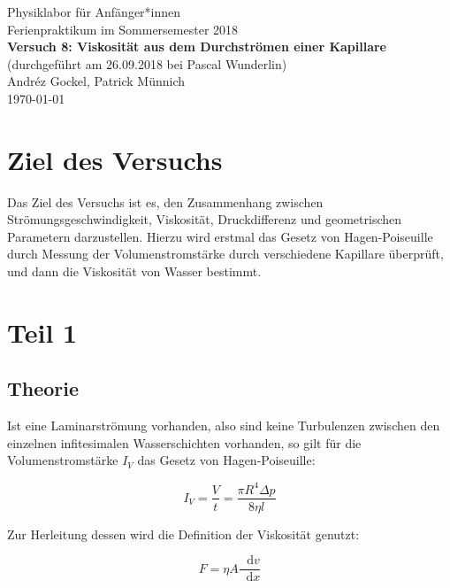 \documentclass[11pt,a4paper]{article}
\newcommand\dif{\mathop{}\!\mathrm{d}}
\begin{document}
{
\centering 
\large 
Physiklabor für Anf\"anger*innen \\
Ferienpraktikum im Sommersemester 2018 \\[4mm]
\textbf{\LARGE 
Versuch 8: Viskosit\"at aus dem Durchstr\"omen einer Kapillare
} \\[3mm]
(durchgef\"uhrt am 26.09.2018 bei Pascal Wunderlin) \\
Andréz Gockel, Patrick M\"unnich\\
\today \\[10mm]
}

\vspace{50pt}
\tableofcontents
\vspace{22pt}
\listoftables
\vspace{22pt}
\listoffigures
\pagebreak

\section{Ziel des Versuchs}

Das Ziel des Versuchs ist es, den Zusammenhang zwischen Str\"omungsgeschwindigkeit, Viskosit\"at, Druckdifferenz und geometrischen Parametern darzustellen. Hierzu wird erstmal das Gesetz von Hagen-Poiseuille durch Messung der Volumenstromst\"arke durch verschiedene Kapillare \"uberpr\"uft, und dann die Viskosit\"at von Wasser bestimmt.

\section{Teil 1}

\subsection{Theorie}

Ist eine Laminarstr\"omung vorhanden, also sind keine Turbulenzen zwischen den einzelnen infitesimalen Wasserschichten vorhanden, so gilt f\"ur die Volumenstromst\"arke $I_V$ das Gesetz von Hagen-Poiseuille:

\begin{equation}
I_V=\frac{V}{t}=\frac{\pi R^4\Delta p}{8\eta l}\label{hagen}
\end{equation}

Zur Herleitung dessen wird die Definition der Viskosit\"at genutzt:

\begin{equation}
F=\eta A\frac{\dif v}{\dif x}
\end{equation}
\end{document}
